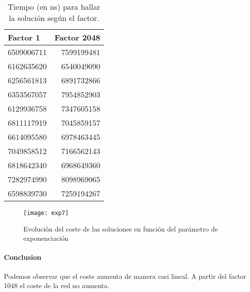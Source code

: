 \begin{table}[htb]
\centering
\begin{tabular}{l|r}
Factor 1 & Factor 2048  \\\hline
6509006711 & 7599199481 \\
6162635620 & 6540049090 \\
6256561813 & 6891732866 \\
6353567057 & 7954852903 \\
6129936758 & 7347605158 \\
6811117919 & 7045859157 \\
6614095580 & 6978463445 \\
7049858512 & 7166562143 \\
6818642340 & 6968649360 \\
7282974990 & 8098969065 \\
6598839730 & 7259194267 \\
\end{tabular}
\caption{\label{tab:widgets}Tiempo (en ns) para hallar la solución según el factor.}
\end{table}

\begin{figure}[h]
  \centering
  \texttt{[image: exp7]}
  \caption{Evolución del coste de las soluciones en función del parámetro de exponenciación}
  \label{fig:exp7}
\end{figure}
\paragraph{Conclusion}
Podemos observar que el coste aumenta de manera casi lineal. A partir del factor 1048 el coste de la red no aumenta.

   